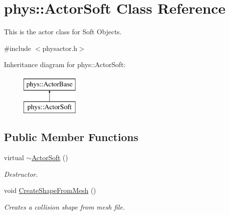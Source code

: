 \hypertarget{classphys_1_1ActorSoft}{
\section{phys::ActorSoft Class Reference}
\label{d4/d23/classphys_1_1ActorSoft}
}


This is the actor class for Soft Objects.  




{\ttfamily \#include $<$physactor.h$>$}

Inheritance diagram for phys::ActorSoft:\begin{figure}[H]
\begin{center}
\leavevmode
\includegraphics[height=2cm]{d4/d23/classphys_1_1ActorSoft}
\end{center}
\end{figure}
\subsection*{Public Member Functions}
\begin{DoxyCompactItemize}
\item 
virtual \hyperlink{classphys_1_1ActorSoft_a636c145f1e468fd45adc8da2a1708fbe}{$\sim$ActorSoft} ()
\begin{DoxyCompactList}\small\item\em Destructor. \item\end{DoxyCompactList}\item 
void \hyperlink{classphys_1_1ActorSoft_a51d78e0f503c3c815511c3d246b426ae}{CreateShapeFromMesh} ()
\begin{DoxyCompactList}\small\item\em Creates a collision shape from mesh file. \item\end{DoxyCompactList}\end{DoxyCompactItemize}
